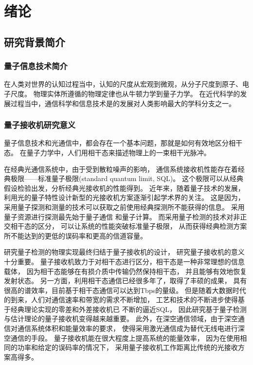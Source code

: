 \chapter{绪论}
\section{研究背景简介}

\subsection{量子信息技术简介}
在人类对世界的认知过程当中，认知的尺度从宏观到微观，从分子尺度到原子、电子尺度。
物理实体所遵循的物理定律也从牛顿力学到量子力学。
在近代科学的发展过程当中，通信科学和信息技术是的发展对人类影响最大的学科分支之一。


\subsection{量子接收机研究意义}
量子信息技术和光通信中，都会存在一个基本问题，那就是如何有效地区分相干态。
在量子力学中，人们用相干态来描述物理上的一束相干光脉冲。

在经典光通信系统中，由于受到散粒噪声的影响，
通信系统接收机性能存在着经典极限——标准量子极限(standard quantum limit, SQL)。
这个极限可以从经典假设检验出发，分析经典光接收机的性能得到。
近年来，随着量子技术的发展，利用光的量子特性设计新型的光接收机方案逐渐引起学术界的关注。
这是因为，采用量子探测和测量的技术可以获取之前使用经典探测所不能获得的信息。
采用量子资源进行探测最先始于量子通信\cite{gisin2007quantum}
和量子计算\cite{ladd2010quantum}。
而采用量子检测的技术对非正交相干态的区分，
可以让系统的性能突破标准量子极限，
从而获得经典检测方案所不能达到的更低的误码率\cite{helstrom1976quantum}和更高的信道容量\cite{hausladen1996classical}。

研究量子检测的物理实现最终归结于量子接收机的设计，
研究量子接收机的意义十分重要。
量子接收机致力于对相干态进行区分，相干态是一种非常理想的信息载体，
因为相干态能够在有损介质中传输仍然保持相干态，
并且能够有效地恢复发射状态。
另一方面，利用相干态通信已经很多年了，取得了丰硕的成果，
具有很高的谱效率，目前基于相干态通信可以达到Tbps的量级\cite{jinno2007networks}。
但是随着大数据时代的到来，人们对通信速率和带宽的需求不断增加，
工艺和技术的不断进步使得基于经典理论实现的零差和外差接收机已
不断的逼近SQL\cite{tsukamoto2006unrepeated}，
因此研究基于量子检测与估计理论的量子接收机变得越来越重要。
此外，在深空通信领域，由于深空通信对通信系统体积和能量效率的要求，
使得采用激光通信成为替代无线电进行深空通信的手段\cite{hemmati2006deep}。
量子接收机能在很大程度上提高系统的能量效率，
因为在使用相同的功率和给定的误码率的情况下，
采用量子接收机工作距离比传统的光接收方案高得多\cite{helstrom1976quantum}。



